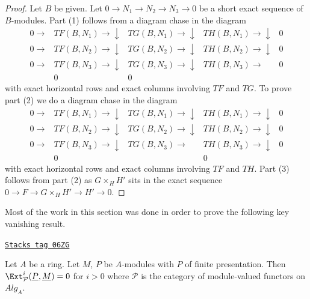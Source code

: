 \begin{proof}
Let $B$ be given. Let $0 \to N_1 \to N_2 \to N_3 \to 0$ be a short exact
sequence of $B$-modules. Part (1) follows from a diagram chase in
the diagram
$$
\begin{array}{ccccc}0 \longrightarrow & TF(B, N_1) \longrightarrow\downarrow & TG(B, N_1) \longrightarrow\downarrow & TH(B, N_1) \longrightarrow\downarrow & 0 \\ 0 \longrightarrow & TF(B, N_2) \longrightarrow\downarrow & TG(B, N_2) \longrightarrow\downarrow & TH(B, N_2) \longrightarrow\downarrow & 0 \\ 0 \longrightarrow & TF(B, N_3) \longrightarrow\downarrow & TG(B, N_3) \longrightarrow\downarrow & TH(B, N_3) \longrightarrow & 0 \\  & 0 & 0 &  & \end{array}
$$
with exact horizontal rows and exact columns involving $TF$ and $TG$.
To prove part (2) we do a diagram chase in the diagram
$$
\begin{array}{ccccc}0 \longrightarrow & TF(B, N_1) \longrightarrow\downarrow & TG(B, N_1) \longrightarrow\downarrow & TH(B, N_1) \longrightarrow\downarrow & 0 \\ 0 \longrightarrow & TF(B, N_2) \longrightarrow\downarrow & TG(B, N_2) \longrightarrow\downarrow & TH(B, N_2) \longrightarrow\downarrow & 0 \\ 0 \longrightarrow & TF(B, N_3) \longrightarrow\downarrow & TG(B, N_3) \longrightarrow & TH(B, N_3) \longrightarrow\downarrow & 0 \\  & 0 &  & 0 & \end{array}
$$
with exact horizontal rows and exact columns involving $TF$ and $TH$.
Part (3) follows from part (2) as $G \times_H H'$ sits in the exact
sequence $0 \to F \to G \times_H H' \to H' \to 0$.
\end{proof}

Most of the work in this section was done in order to prove the
following key vanishing result.

\begin{lemma}
\label{adequate-lemma-ext-group-zero-key}
\href{https://stacks.math.columbia.edu/tag/06ZG}{\texttt{Stacks tag 06ZG}}

Let $A$ be a ring. Let $M$, $P$ be $A$-modules with $P$ of finite
presentation. Then
$\Ext^i_\mathcal{P}(\underline{P}, \underline{M}) = 0$
for $i > 0$ where $\mathcal{P}$ is the category of module-valued
functors on $\textit{Alg}_A$.
\end{lemma}

